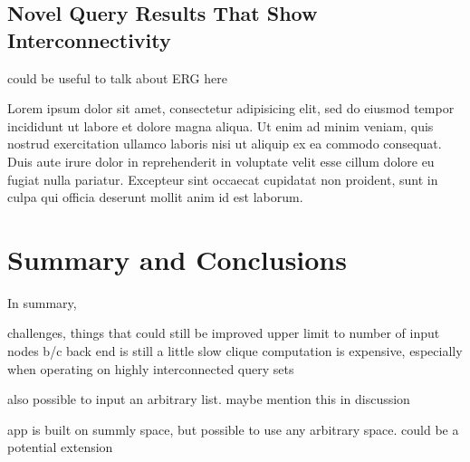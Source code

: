 \documentclass[12pt]{article}
\begin{document}
\subsection{Novel Query Results That Show Interconnectivity}
could be useful to talk about ERG here

Lorem ipsum dolor sit amet, consectetur adipisicing elit, sed do eiusmod tempor incididunt ut labore et dolore magna aliqua. Ut enim ad minim veniam, quis nostrud exercitation ullamco laboris nisi ut aliquip ex ea commodo consequat. Duis aute irure dolor in reprehenderit in voluptate velit esse cillum dolore eu fugiat nulla pariatur. Excepteur sint occaecat cupidatat non proident, sunt in culpa qui officia deserunt mollit anim id est laborum.



\section{Summary and Conclusions}
In summary, 

challenges, things that could still be improved
upper limit to number of input nodes b/c back end is still a little slow
clique computation is expensive, especially when operating on highly interconnected query sets

also possible to input an arbitrary list. maybe mention this in discussion

app is built on summly space, but possible to use any arbitrary space. could be a potential extension 



\end{document}

